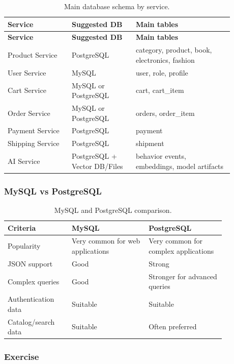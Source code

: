 \documentclass[12pt,a4paper]{article}
\begin{document}
\begin{longtable}{p{0.25\linewidth}p{0.25\linewidth}p{0.38\linewidth}}
\caption{Main database schema by service.}
\label{tab:ecom-db-schema}\\
\toprule
\textbf{Service} & \textbf{Suggested DB} & \textbf{Main tables}\\
\midrule
\endfirsthead
\toprule
\textbf{Service} & \textbf{Suggested DB} & \textbf{Main tables}\\
\midrule
\endhead
Product Service & PostgreSQL & category, product, book, electronics, fashion\\
User Service & MySQL & user, role, profile\\
Cart Service & MySQL or PostgreSQL & cart, cart\_item\\
Order Service & MySQL or PostgreSQL & orders, order\_item\\
Payment Service & PostgreSQL & payment\\
Shipping Service & PostgreSQL & shipment\\
AI Service & PostgreSQL + Vector DB/Files & behavior events, embeddings, model artifacts\\
\bottomrule
\end{longtable}

\subsubsection{MySQL vs PostgreSQL}

\begin{table}[H]
\centering
\caption{MySQL and PostgreSQL comparison.}
\label{tab:mysql-postgres}
\begin{tabular}{p{0.25\linewidth}p{0.30\linewidth}p{0.30\linewidth}}
\toprule
\textbf{Criteria} & \textbf{MySQL} & \textbf{PostgreSQL}\\
\midrule
Popularity & Very common for web applications & Very common for complex applications\\
JSON support & Good & Strong\\
Complex queries & Good & Stronger for advanced queries\\
Authentication data & Suitable & Suitable\\
Catalog/search data & Suitable & Often preferred\\
\bottomrule
\end{tabular}
\end{table}

\subsubsection{Exercise}
\end{document}
